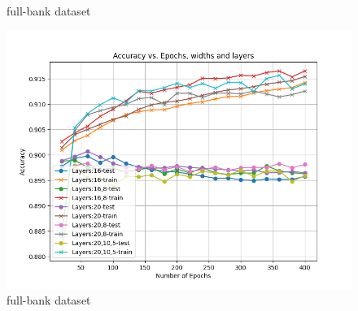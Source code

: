 \documentclass[8pt]{article}
\begin{document}
\begin{figure}[H]
\begin{minipage}{0.32\textwidth}
        \caption{full-bank dataset}
        \label{fig:AccVsLayer_maxe400_layer_1031_175715 on full bank dataset}
    \end{minipage}
    \begin{minipage}{0.32\textwidth}
        \centering
        \includegraphics[width=\textwidth]{../Prob2/out/task4/full_bank/AccVsLayer_maxe400_layer_1031_180102.png}
        \caption{full-bank dataset}
        \label{fig:AccVsLayer_maxe400_layer_1031_180102 on wine_quality dataset}
    \end{minipage}


\end{figure}
\end{document}
